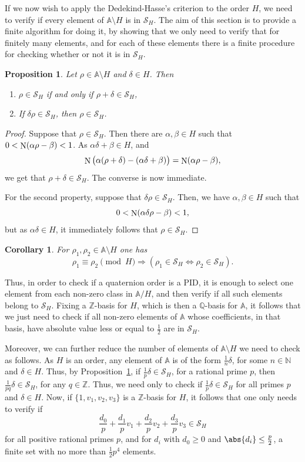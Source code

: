 \documentclass[10pt]{article}
\newtheorem{proposition}{Proposition}
\newtheorem{corollary}{Corollary}
\theoremstyle{definition}
\newcommand\A{\mathbb{A}}
\newcommand\NN{\mathbb{N}}
\newcommand\QQ{\mathbb{Q}}
\newcommand\ZZ{\mathbb{Z}}
\newcommand\SC{\mathcal{S}}
\newcommand\N{\mathop{\rm N}\nolimits}
\begin{document}
If we now wish to apply the Dedekind-Hasse's criterion to the order
$H$, we need to verify if every element of $\A \setminus H$ is in
$\SC_H$. The aim of this section is to provide a finite algorithm for
doing it, by showing that we only need to verify that for finitely
many elements, and for each of these elements there is a finite
procedure for checking whether or not it is in $\SC_H$.

\begin{proposition}\label{sum_prod}
  Let $\rho \in \A \setminus H$ and $\delta \in H$. Then
  \begin{enumerate}
  \item $\rho \in \SC_H$ if and only if $\rho + \delta \in \SC_H$,
  \item If $\delta \rho \in \SC_H$, then $ \rho \in \SC_H$.
  \end{enumerate}
\end{proposition}

\begin{proof}
  Suppose that $\rho \in \SC_H$. Then there are $\alpha, \beta \in H$
  such that $ 0 < \N(\alpha \rho - \beta) < 1$. As
  $\alpha\delta + \beta \in H$, and
  \[ \N \big (\alpha (\rho + \delta) - (\alpha\delta + \beta) \big ) =
    \N(\alpha \rho - \beta), \] we get that $\rho + \delta \in
  \SC_H$. The converse is now immediate.
	
  For the second property, suppose that $\delta \rho \in \SC_H$. Then,
  we have $\alpha, \beta \in H$ such that
  \[ 0 < \N(\alpha \delta \rho - \beta) < 1,\] but as
  $\alpha\delta \in H$, it immediately follows that $\rho \in \SC_H$.
\end{proof}

\begin{corollary}
  For $\rho_1, \rho_2 \in \A \setminus H$ one has
  \[ \rho_1 \equiv \rho_2 \pmod{H} \Longrightarrow (\rho_1 \in \SC_H
    \iff \rho_2 \in \SC_H).\]
\end{corollary}

Thus, in order to check if a quaternion order is a PID, it is enough
to select one element from each non-zero class in $\A/H$, and then
verify if all such elements belong to $\SC_H$. Fixing a $\ZZ$-basis
for $H$, which is then a $\QQ$-basis for $\A$, it follows that we just
need to check if all non-zero elements of $\A$ whose coefficients, in
that basis, have absolute value less or equal to $\frac{1}{2}$ are in
$\SC_H$.

Moreover, we can further reduce the number of elements of
$\A \setminus H$ we need to check as follows. As $H$ is an order, any
element of $\A$ is of the form $\frac{1}{n} \delta$, for some
$n \in \NN$ and $\delta \in H$. Thus, by Proposition~\ref{sum_prod},
if $\frac{1}{p} \delta \in \SC_H$, for a rational prime $p$, then
$\frac{1}{pq} \delta \in \SC_H$, for any $q \in \ZZ$. Thus, we need
only to check if $\frac{1}{p} \delta \in \SC_H$ for all primes $p$ and
$\delta \in H$. Now, if $\{1,v_1,v_2,v_3\}$ is a $\ZZ$-basis for $H$,
it follows that one only needs to verify if
\[\frac{d_0}{p} + \frac{d_1}{p} v_1 + \frac{d_2}{p} v_2 +
  \frac{d_3}{p} v_3\in\SC_H\] for all positive rational primes $p$,
and for $d_i$ with $d_0\geq 0$ and $\abs{d_i} \leq \frac{p}{2}$, a
finite set with no more than $\frac12 p^4$ elements.
\end{document}
